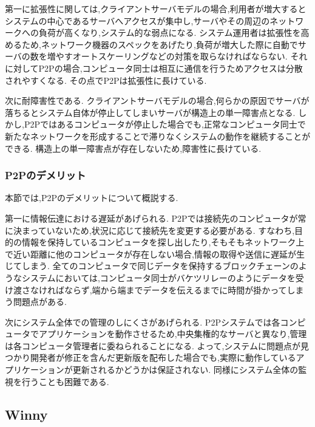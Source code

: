 第一に拡張性に関しては,クライアントサーバモデルの場合,利用者が増大するとシステムの中心であるサーバへアクセスが集中し,サーバやその周辺のネットワークへの負荷が高くなり,システム的な弱点になる.
システム運用者は拡張性を高めるため,ネットワーク機器のスペックをあげたり,負荷が増大した際に自動でサーバの数を増やすオートスケーリングなどの対策を取らなければならない.
それに対してP2Pの場合,コンピュータ同士は相互に通信を行うためアクセスは分散されやすくなる.
その点でP2Pは拡張性に長けている.

次に耐障害性である.
クライアントサーバモデルの場合,何らかの原因でサーバが落ちるとシステム自体が停止してしまいサーバが構造上の単一障害点となる.
しかし,P2Pではあるコンピュータが停止した場合でも,正常なコンピュータ同士で新たなネットワークを形成することで滞りなくシステムの動作を継続することができる.
構造上の単一障害点が存在しないため,障害性に長けている.

\subsubsection{P2Pのデメリット}

本節では,P2Pのデメリットについて概説する.

第一に情報伝達における遅延があげられる.
P2Pでは接続先のコンピュータが常に決まっていないため,状況に応じて接続先を変更する必要がある.
すなわち,目的の情報を保持しているコンピュータを探し出したり,そもそもネットワーク上で近い距離に他のコンピュータが存在しない場合,情報の取得や送信に遅延が生じてしまう.
全てのコンピュータで同じデータを保持するブロックチェーンのようなシステムにおいては,コンピュータ同士がバケツリレーのようにデータを受け渡さなければならず,端から端までデータを伝えるまでに時間が掛かってしまう問題点がある.

次にシステム全体での管理のしにくさがあげられる.
P2Pシステムでは各コンピュータでアプリケーションを動作させるため,中央集権的なサーバと異なり,管理は各コンピュータ管理者に委ねられることになる.
よって,システムに問題点が見つかり開発者が修正を含んだ更新版を配布した場合でも,実際に動作しているアプリケーションが更新されるかどうかは保証されない.
同様にシステム全体の監視を行うことも困難である.

\subsection{Winny}

